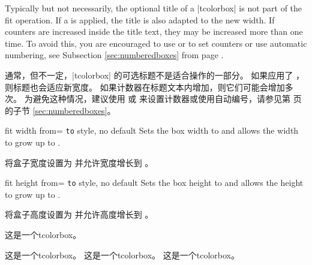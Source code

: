\begin{marker}
Typically but not necessarily, the optional title of a |tcolorbox| is not part of the fit operation.
If a  is applied, the title is also adapted to
the new width. If counters are increased inside the title text, they may be
increased more than one time.
To avoid this, you are encouraged to use  or 
to set counters or use automatic numbering, see Subsection \ref{sec:numberedboxes}
from page \pageref{sec:numberedboxes}.

通常，但不一定，|tcolorbox| 的可选标题不是适合操作的一部分。
如果应用了 ，则标题也会适应新宽度。
如果计数器在标题文本内增加，则它们可能会增加多次。
为避免这种情况，建议使用  或  来设置计数器或使用自动编号，请参见第 \pageref{sec:numberedboxes} 页的子节 \ref{sec:numberedboxes}。
\end{marker}


\begin{docTcbKey}{fit width from}{= \texttt{to} }{style, no default}
Sets the box width to  and allows the width to grow up to .

将盒子宽度设置为  并允许宽度增长到 。
\begin{dispExample}

\begin{tcolorbox}[fit,width=\linewidth/2]
\lipsum[2]
\end{tcolorbox}\par
\begin{tcolorbox}[fit width from=\linewidth/2 to \linewidth]
\lipsum[2]
\end{tcolorbox}\par
\end{dispExample}
\end{docTcbKey}

 
\begin{docTcbKey}{fit height from}{= \texttt{to} }{style, no default}
Sets the box height to  and allows the height to grow up to .

将盒子高度设置为  并允许高度增长到 。
\begin{dispExample}

\begin{mybox}
这是一个tcolorbox。
\end{mybox}
\begin{mybox}
这是一个tcolorbox。 这是一个tcolorbox。 这是一个tcolorbox。
\end{mybox}
\begin{mybox}
\lipsum[2]
\end{mybox}
\end{dispExample}
\end{docTcbKey}


